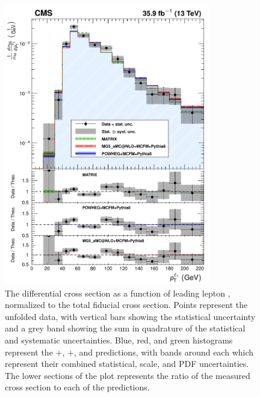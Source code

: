 \begin{figure}[htbp]
  \begin{center}
    \includegraphics[width=0.8\textwidth]{results/unfold_l1Pt.pdf}
    \caption[Normalized differential {\ZZ} cross section as a function of leading lepton {\pt}]{
        The {\ZZ} differential cross section as a function of leading lepton {\pt}, normalized to the total fiducial cross section.
        Points represent the unfolded data, with vertical bars showing the statistical uncertainty and a grey band showing the sum in quadrature of the statistical and systematic uncertainties.
        Blue, red, and green histograms represent the {\POWHEG}+{\MCFM}, {\MGAMC}+{\MCFM}, and {\MATRIX} predictions, with bands around each which represent their combined statistical, scale, and PDF uncertainties.
        The lower sections of the plot represents the ratio of the measured cross section to each of the predictions.
      }\label{fig:unfold_l1Pt}
  \end{center}
\end{figure}

